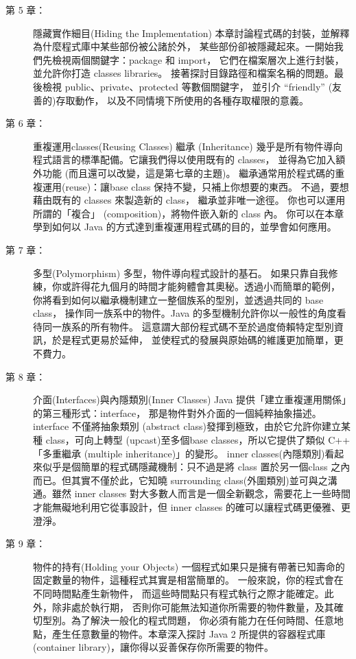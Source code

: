 \begin{description}
\item [第 5 章：] 隱藏實作細目(Hiding the Implementation)
本章討論程式碼的封裝，並解釋為什麼程式庫中某些部份被公諸於外，
某些部份卻被隱藏起來。一開始我們先檢視兩個關鍵字：package 和 import，
它們在檔案層次上進行封裝，並允許你打造 classes libraries。
接著探討目錄路徑和檔案名稱的問題。最後檢視 public、private、protected
等數個關鍵字， 並引介 ``friendly'' (友善的)存取動作，
以及不同情境下所使用的各種存取權限的意義。
\item [第 6 章：] 重複運用classes(Reusing Classes) 繼承 (Inheritance)
幾乎是所有物件導向程式語言的標準配備。它讓我們得以使用既有的 classes，
並得為它加入額外功能 (而且還可以改變，這是第七章的主題)。
繼承通常用於程式碼的重複運用(reuse)：讓base class 保持不變，只補上你想要的東西。
不過，要想藉由既有的 classes 來製造新的 class， 繼承並非唯一途徑。
你也可以運用所謂的「複合」 (composition)，將物件嵌入新的 class 內。
你可以在本章學到如何以 Java 的方式達到重複運用程式碼的目的，並學會如何應用。
\item [第 7 章：] 多型(Polymorphism) 多型，物件導向程式設計的基石。
如果只靠自我修練，你或許得花九個月的時間才能夠體會其奧秘。透過小而簡單的範例，
你將看到如何以繼承機制建立一整個族系的型別，並透過共同的 base class，
操作同一族系中的物件。Java
的多型機制允許你以一般性的角度看待同一族系的所有物件。
這意謂大部份程式碼不至於過度倚賴特定型別資訊，於是程式更易於延伸，
並使程式的發展與原始碼的維護更加簡單，更不費力。
\item [第 8 章：] 介面(Interfaces)與內隱類別(Inner Classes)
Java 提供「建立重複運用關係」的第三種形式：interface，
那是物件對外介面的一個純粹抽象描述。interface 不僅將抽象類別
(abstract class)發揮到極致，由於它允許你建立某種 class，可向上轉型
(upcast)至多個base classes，所以它提供了類似 C++「多重繼承
(multiple inheritance)」的變形。
inner classes(內隱類別)看起來似乎是個簡單的程式碼隱藏機制：只不過是將
class 置於另一個class 之內而已。但其實不僅於此，它知曉
surrounding class(外圍類別)並可與之溝通。雖然 inner classes
對大多數人而言是一個全新觀念，需要花上一些時間才能無礙地利用它從事設計，但
inner classes 的確可以讓程式碼更優雅、更澄淨。
\item [第 9 章：] 物件的持有(Holding your Objects)
一個程式如果只是擁有帶著已知壽命的固定數量的物件，這種程式其實是相當簡單的。
一般來說，你的程式會在不同時間點產生新物件，
而這些時間點只有程式執行之際才能確定。此外，除非處於執行期，
否則你可能無法知道你所需要的物件數量，及其確切型別。為了解決一般化的程式問題，
你必須有能力在任何時間、任意地點，產生任意數量的物件。本章深入探討 Java 2
所提供的容器程式庫(container library)，讓你得以妥善保存你所需要的物件。

\end{description}
